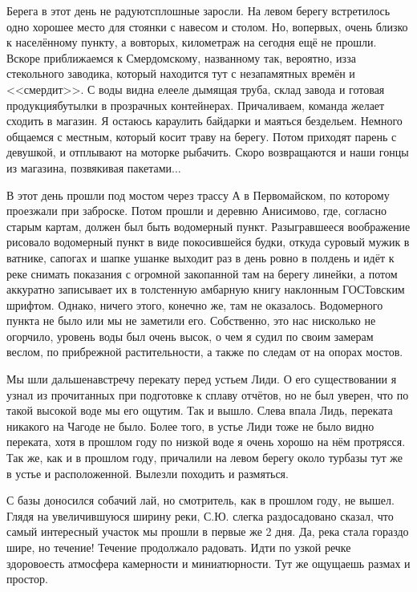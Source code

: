 Берега в этот день не радуют\mdash  сплошные заросли. На левом берегу встретилось одно хорошее место для стоянки с навесом и столом. Но, во\sdash первых, очень близко к населённому пункту, а во\sdash вторых, километраж на сегодня ещё не прошли. Вскоре приближаемся к Смердомскому, названному так, вероятно, из\sdash за стекольного заводика, который находится тут с незапамятных времён и <<смердит>>. С воды видна еле\sdash еле дымящая труба, склад завода и готовая продукция\mdash  бутылки в прозрачных контейнерах. Причаливаем, команда желает сходить в магазин. Я остаюсь караулить байдарки и маяться бездельем. Немного общаемся с местным, который косит траву на берегу. Потом приходят парень с девушкой, и отплывают на моторке рыбачить. Скоро возвращаются и наши гонцы из магазина, позвякивая пакетами$\ldots$ 

В этот день прошли под мостом через трассу А в Первомайском, по которому проезжали при заброске. Потом прошли и деревню Анисимово, где, согласно старым картам, должен был быть водомерный пункт. Разыгравшееся воображение рисовало водомерный пункт в виде покосившейся будки, откуда суровый мужик в ватнике, сапогах и шапке ушанке выходит раз в день ровно в полдень и идёт к реке снимать показания с огромной закопанной там на берегу линейки, а потом аккуратно записывает их в толстенную амбарную книгу наклонным ГОСТ\sdash овским шрифтом. Однако, ничего этого, конечно же, там не оказалось. Водомерного пункта не было или мы не заметили его. Собственно, это нас нисколько не огорчило, уровень воды был очень высок, о чем я судил по своим замерам веслом, по прибрежной растительности, а также по следам от на опорах мостов. 

Мы шли дальше\mdash  навстречу перекату перед устьем Лиди. О его существовании я узнал из прочитанных при подготовке к сплаву отчётов, но не был уверен, что по такой высокой воде мы его ощутим. Так и вышло. Слева впала Лидь, переката никакого на Чагоде не было. Более того, в устье Лиди тоже не было видно переката, хотя в прошлом году по низкой воде я очень хорошо на нём протрясся. Так же, как и в прошлом году, причалили на левом берегу около турбазы тут же в устье и расположенной. Вылезли походить и размяться. 

С базы доносился собачий лай, но смотритель, как в прошлом году, не вышел. Глядя на увеличившуюся ширину реки, С.Ю. слегка раздосадовано сказал, что самый интересный участок мы прошли в первые же 2 дня. Да, река стала гораздо шире, но течение! Течение продолжало радовать. Идти по узкой речке здорово\mdash  есть атмосфера камерности и миниатюрности. Тут же ощущаешь размах и простор.

